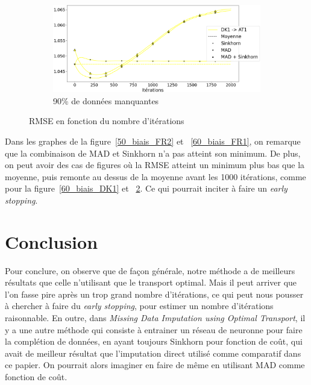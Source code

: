 \documentclass[acmsmall, natbib=false, nonacm]{acmart}
\begin{document}
\begin{figure}[H]
\begin{subfigure}[b]{0.4\textwidth}
    \end{subfigure}
    \hfill
    \begin{subfigure}[b]{0.4\textwidth}
        \centering
        \includegraphics[scale=0.14]{images/90_biais_AT1.png}
        \caption{90\% de données manquantes}
        \label{90_biais_AT1}
    \end{subfigure}
       \caption{RMSE en fonction du nombre d'itérations}
\end{figure}

Dans les graphes de la figure~\ref{50_biais_FR2} et ~\ref{60_biais_FR1}, on remarque que la combinaison de MAD et Sinkhorn n'a pas atteint son minimum.
De plus, on peut avoir des cas de figures où la RMSE atteint un minimum plus bas que la moyenne, puis remonte au dessus de la moyenne avant les 1000 itérations,
comme pour la figure~\ref{60_biais_DK1} et ~\ref{90_biais_AT1}.
Ce qui pourrait inciter à faire un \textit{early stopping}.


\section{Conclusion}
Pour conclure, on observe que de façon générale, notre méthode a de meilleurs résultats que celle n'utilisant que le transport optimal.
Mais il peut arriver que l'on fasse pire après un trop grand nombre d'itérations, ce qui peut nous pousser à chercher à faire du \textit{early stopping},
pour estimer un nombre d'itérations raisonnable.
En outre, dans \textit{Missing Data Imputation using Optimal Transport}, il y a une autre méthode qui consiste à entrainer un réseau de neuronne pour faire la complétion de données,
en ayant toujours Sinkhorn pour fonction de coût, qui avait de meilleur résultat que l'imputation direct utilisé comme comparatif dans ce papier. 
On pourrait alors imaginer en faire de même en utilisant MAD comme fonction de coût.
\end{document}
